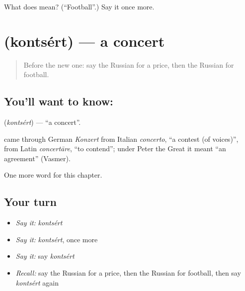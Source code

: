 \begin{tcolorbox}[breakable,colback=teal!4,colframe=teal!35!black,title={Before you move on}]
What does  mean? (\textquotedblleft{}Football\textquotedblright{}.) Say it once more.
\end{tcolorbox}
\section[\texorpdfstring{\ru{концерт} (kontsért)}{концерт (kontsért)}]{ (kontsért) — a concert}

\label{lesson:RU-C114-concert}



\begin{quote}
Before the new one: say the Russian for a price, then the Russian for football.
\end{quote}

\subsection*{You'll want to know: }
\textbf{} (\emph{kontsért}) — \textquotedblleft{}a concert\textquotedblright{}.

\begin{cousinweb}
\textbf{} came through German \emph{Konzert} from Italian \emph{concerto}, \textquotedblleft{}a contest (of voices)\textquotedblright{}, from Latin \emph{concertāre}, \textquotedblleft{}to contend\textquotedblright{}; under Peter the Great it meant \textquotedblleft{}an agreement\textquotedblright{} (Vasmer).
\end{cousinweb}

\begin{grammarlens}[title={What you've built}]
One more word for this chapter.
\end{grammarlens}

\subsection*{Your turn}
\begin{itemize}
\raggedright
  \item \emph{Say it:} \emph{kontsért}
  \item \emph{Say it:} \emph{kontsért}, once more
  \item \emph{Say it:} say \emph{kontsért}
  \item \emph{Recall:} say the Russian for a price, then the Russian for football, then say \emph{kontsért} again
\end{itemize}

